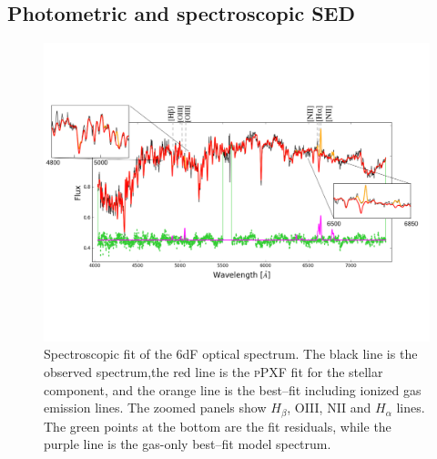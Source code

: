
\subsection{Photometric and spectroscopic SED}\label{sedsec}

\begin{figure}
\includegraphics[width=1\textwidth]{./chapters/chapter3/Figures/f3a.pdf}%
\caption{Spectroscopic fit of the 6dF optical spectrum. The black line is the observed spectrum,the red line is the \textsc{pPXF} fit for the stellar component, and the orange line is the best--fit including ionized gas emission lines. The zoomed panels show $H_\beta$, OIII, NII and $H_\alpha$ lines. The green points at the bottom are the fit residuals, while the purple line is the gas-only best--fit model spectrum. }\label{spec}\end{figure}

